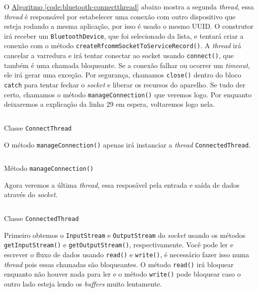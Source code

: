 \documentclass[a4paper,12pt,brazil,oneside]{book}
\begin{document}
\begin{singlespace}
	O \hyperref[code:bluetooth-connectthread]{Algoritmo \ref*{code:bluetooth-connectthread}} abaixo mostra a segunda \emph{thread}, essa \emph{thread} é responsável por estabelecer uma conexão com outro dispositivo que esteja rodando a mesma aplicação, por isso é usado o mesmo UUID. O construtor irá receber um \texttt{BluetoothDevice}, que foi selecionado da lista, e tentará criar a conexão com o método \texttt{createRfcommSocketToServiceRecord()}. A \emph{thread} irá cancelar a varredura e irá tentar conectar ao socket usando \texttt{connect()}, que também é uma chamada bloqueante. Se a conexão falhar ou ocorrer um \emph{timeout}, ele irá gerar uma exceção. Por segurança, chamamos \texttt{close()} dentro do bloco \texttt{catch} para tentar fechar o \emph{socket} e liberar os recursos do aparelho. Se tudo der certo, chamamos o método \texttt{manageConnection()} que veremos logo. Por enquanto deixaremos a explicação da linha 29 em espera, voltaremos logo nela.

	\begin{listing}[H]
	\inputminted[linenos=true,fontsize=\small,frame=lines, framesep=2mm, tabsize=2,numbersep=5pt]{java}{src/api/bluetooth/connectthread.java}
	\caption{Classe \texttt{ConnectThread}}
	\label{code:bluetooth-connectthread}
	\end{listing} 	

	O método \texttt{manageConnection()} apenas irá instanciar a \emph{thread} \texttt{ConnectedThread}.

	\begin{listing}[H]
	\inputminted[linenos=true,fontsize=\small,frame=lines, framesep=2mm, tabsize=2,numbersep=5pt]{java}{src/api/bluetooth/manage.java}
	\caption{Método \texttt{manageConnection()}}
	\label{code:bluetooth-manage}
	\end{listing} 	

	Agora veremos a última \emph{thread}, essa resposável pela entrada e saída de dados através do \emph{socket}.

	\begin{listing}[H]
	\inputminted[linenos=true,fontsize=\small,frame=lines, framesep=2mm, tabsize=2,numbersep=5pt]{java}{src/api/bluetooth/connected.java}
	\caption{Classe \texttt{ConnectedThread}}
	\label{code:bluetooth-connected}
	\end{listing} 	

	Primeiro obtemos o \texttt{InputStream} e \texttt{OutputStream} do \emph{socket} usando os métodos \texttt{getInputStream()} e \texttt{getOutputStream()}, respectivamente. Você pode ler e escrever o fluxo de dados usando \texttt{read()} e \texttt{write()}, é necessário fazer isso numa \emph{thread} pois essas chamadas são bloqueantes. O método \texttt{read()} irá bloquear enquanto não houver nada para ler e o método \texttt{write()} pode bloquear caso o outro lado esteja lendo os \emph{buffers} muito lentamente. 


\end{singlespace}
\end{document}
